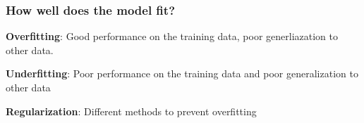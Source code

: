 \documentclass[aspectratio=169]{beamer}
\begin{document}
\begin{frame}
  \frametitle{How well does the model fit?}

  \begin{block}{}
    \begin{center}
      \textbf{Overfitting}: Good performance on the training data, poor
      generliazation to other data.\\      
    \end{center}
  \end{block}
  \begin{block}{}
    \begin{center}
      \textbf{Underfitting}: Poor performance on the training data and
      poor generalization to other data\\
    \end{center}
  \end{block}
  
  \begin{block}{}
    \begin{center}
      \textbf{Regularization}: Different methods to prevent overfitting\\
    \end{center}
  \end{block}
  
\end{frame}


  

\end{document}
